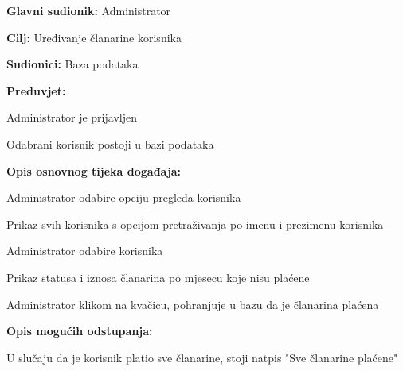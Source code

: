 \documentclass[times, utf8, zavrsni]{fer}
\newenvironment{packed_enum}{
	\begin{enumerate}
		\setlength{\itemsep}{0pt}
		\setlength{\parskip}{0pt}
		\setlength{\parsep}{0pt}
	}{\end{enumerate}}
\newenvironment{packed_item}{
	\begin{itemize}
		\setlength{\itemsep}{0pt}
		\setlength{\parskip}{0pt}
		\setlength{\parsep}{0pt}
	}{\end{itemize}}
\begin{document}
			\noindent {}
					\begin{packed_item}
						
						\item \textbf{Glavni sudionik: } Administrator
						\item  \textbf{Cilj:} Uređivanje članarine korisnika
						\item  \textbf{Sudionici:} Baza podataka
						\item  \textbf{Preduvjet:} 
						
						\item[] \begin{packed_enum}
							
							\item Administrator je prijavljen
							\item Odabrani korisnik postoji u bazi podataka
							
							
						\end{packed_enum}
						
						\item  \textbf{Opis osnovnog tijeka događaja:}
						
						\item[] \begin{packed_enum}
							
							\item Administrator odabire opciju pregleda korisnika
							\item Prikaz svih korisnika s opcijom pretraživanja po imenu i prezimenu korisnika
							\item Administrator odabire korisnika
							\item Prikaz statusa i iznosa članarina po mjesecu koje nisu plaćene
							\item Administrator klikom  na kvačicu, pohranjuje u bazu da je članarina plaćena
							
						\end{packed_enum}
						
						\item  \textbf{Opis mogućih odstupanja:}
						
						\item[] \begin{packed_enum}
							
							\item U slučaju da je korisnik platio sve članarine, stoji natpis "Sve članarine plaćene"
							
						\end{packed_enum}
						
					\end{packed_item}
					
\end{document}

